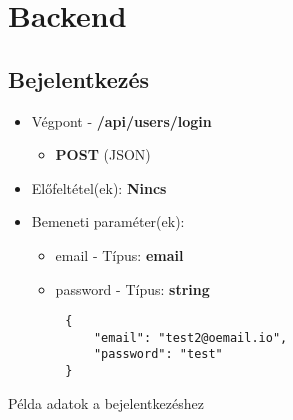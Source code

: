 ﻿\chapter{Backend}

\section{Bejelentkezés}
\begin{itemize}
    \item Végpont - \textbf{/api/users/login}
    \begin{itemize}
        \item \textbf{POST} (JSON)
    \end{itemize}
    \item Előfeltétel(ek): \textbf{Nincs}
\end{itemize}
\begin{itemize}
    \item Bemeneti paraméter(ek):
    \begin{itemize}
        \item email - Típus: \textbf{email}
        \item password - Típus: \textbf{string}
    \end{itemize}
\end{itemize}
\begin{listing}[H]
    \begin{verbatim}
        {
            "email": "test2@oemail.io",
            "password": "test"
        }
    \end{verbatim}
    \caption{Példa adatok a bejelentkezéshez}
    \label{code:json_login}
\end{listing}

